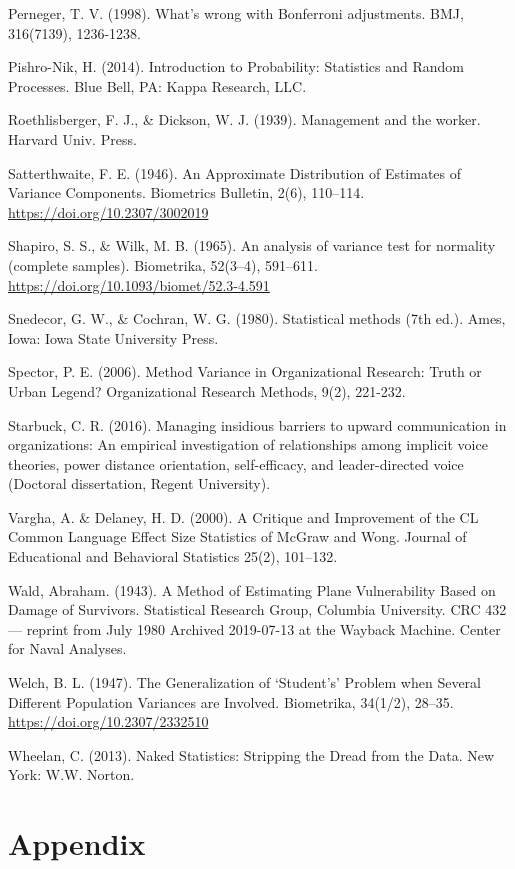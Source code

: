 \documentclass[]{book}
\begin{document}
Perneger, T. V. (1998). What's wrong with Bonferroni adjustments. BMJ, 316(7139), 1236-1238.

Pishro-Nik, H. (2014). Introduction to Probability: Statistics and Random Processes. Blue Bell, PA: Kappa Research, LLC.

Roethlisberger, F. J., \& Dickson, W. J. (1939). Management and the worker. Harvard Univ. Press.

Satterthwaite, F. E. (1946). An Approximate Distribution of Estimates of Variance Components. Biometrics Bulletin, 2(6), 110--114. \url{https://doi.org/10.2307/3002019}

Shapiro, S. S., \& Wilk, M. B. (1965). An analysis of variance test for normality (complete samples). Biometrika, 52(3--4), 591--611. \url{https://doi.org/10.1093/biomet/52.3-4.591}

Snedecor, G. W., \& Cochran, W. G. (1980). Statistical methods (7th ed.). Ames, Iowa: Iowa State University Press.

Spector, P. E. (2006). Method Variance in Organizational Research: Truth or Urban Legend? Organizational Research Methods, 9(2), 221-232.

Starbuck, C. R. (2016). Managing insidious barriers to upward communication in organizations: An empirical investigation of relationships among implicit voice theories, power distance orientation, self-efficacy, and leader-directed voice (Doctoral dissertation, Regent University).

Vargha, A. \& Delaney, H. D. (2000). A Critique and Improvement of the CL Common Language Effect Size Statistics of McGraw and Wong. Journal of Educational and Behavioral Statistics 25(2), 101--132.

Wald, Abraham. (1943). A Method of Estimating Plane Vulnerability Based on Damage of Survivors. Statistical Research Group, Columbia University. CRC 432 --- reprint from July 1980 Archived 2019-07-13 at the Wayback Machine. Center for Naval Analyses.

Welch, B. L. (1947). The Generalization of `Student's' Problem when Several Different Population Variances are Involved. Biometrika, 34(1/2), 28--35. \url{https://doi.org/10.2307/2332510}

Wheelan, C. (2013). Naked Statistics: Stripping the Dread from the Data. New York: W.W. Norton.

\hypertarget{appendix}{%
\chapter{Appendix}\label{appendix}}
\end{document}
